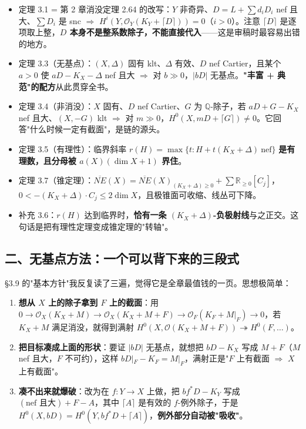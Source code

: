 \begin{itemize}
\item 定理 3.1 = 第 2 章消没定理 2.64 的改写：$Y$ 非奇异、$D=L+\sum d_iD_i$ nef 且大、$\sum D_i$ 是 snc $\Rightarrow$ $H^i(Y,\mathcal{O}_Y(K_Y+\lceil D\rceil))=0$（$i>0$）。注意 $\lceil D\rceil$ 是逐项取上整，\textbf{$D$ 本身不是整系数除子，不能直接代入}——这是审稿时最容易出错的地方。
\item 定理 3.3（无基点）：$(X,\Delta)$ 固有 klt、$\Delta$ 有效、$D$ nef Cartier，且某个 $a>0$ 使 $aD-K_X-\Delta$ nef 且大 $\Rightarrow$ 对 $b\gg0$，$|bD|$ 无基点。\textbf{"丰富 + 典范"的配方}从此贯穿全书。
\item 定理 3.4（非消没）：$X$ 固有、$D$ nef Cartier、$G$ 为 $\mathbb{Q}$-除子，若 $aD+G-K_X$ nef 且大、$(X,-G)$ klt $\Rightarrow$ 对 $m\gg0$，$H^0(X,mD+\lceil G\rceil)\ne0$。它回答"什么时候一定有截面"，是链的源头。
\item 定理 3.5（有理性）：临界斜率 $r(H)=\max\{t:H+t(K_X+\Delta)\ \text{nef}\}$ \textbf{是有理数，且分母被 $a(X)(\dim X+1)$ 界住}。
\item 定理 3.7（锥定理）：$\overline{NE}(X)=\overline{NE}(X)_{(K_X+\Delta)\ge0}+\sum\mathbb{R}_{\ge0}[C_j]$，$0<-(K_X+\Delta)\cdot C_j\le2\dim X$，且极锥面可收缩、线丛可下降。
\item 补充 3.6：$r(H)$ 达到临界时，\textbf{恰有一条 $(K_X+\Delta)$-负极射线}与之正交。这句话是把有理性定理变成锥定理的"转轴"。
\end{itemize}

\subsection*{二、无基点方法：一个可以背下来的三段式}

\S3.9 的"基本方针"我反复读了三遍，觉得它是全章最值钱的一页。思想极简单：

\begin{enumerate}
\item \textbf{想从 $X$ 上的除子拿到 $F$ 上的截面}：用 $0\to\mathcal{O}_X(K_X+M)\to\mathcal{O}_X(K_X+M+F)\to\mathcal{O}_F(K_F+M|_F)\to0$，若 $K_X+M$ 满足消没，就得到满射 $H^0(X,\mathcal{O}(K_X+M+F))\twoheadrightarrow H^0(F,\dots)$。
\item \textbf{把目标凑成上面的形状}：要证 $|bD|$ 无基点，就想把 $bD-K_X$ 写成 $M+F$（$M$ nef 且大，$F$ 不可约），这样 $bD|_F-K_F=M|_F$，满射正是"$F$ 上有截面 $\Rightarrow$ $X$ 上有截面"。
\item \textbf{凑不出来就爆破}：改为在 $f:Y\to X$ 上做，把 $bf^*D-K_Y$ 写成 $(\text{nef 且大})+F-A$，其中 $\lceil A\rceil$ 是有效的 $f$-例外除子，于是 $H^0(X,bD)=H^0(Y,bf^*D+\lceil A\rceil)$，\textbf{例外部分自动被"吸收"}。
\end{enumerate}

